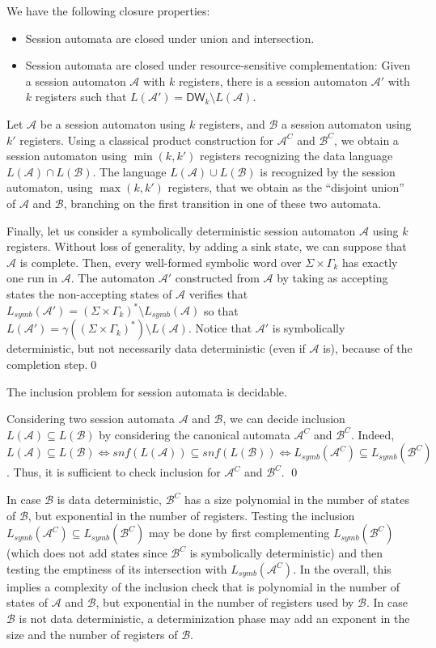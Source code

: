\documentclass{LMCS}
\def\A{\mathcal A}
\def\B{\mathcal B}
\def\cB{\mathcal B}
\def\concretization{\gamma}
\newcommand{\kNat}[1]{\Gamma_{#1}}
\newcommand{\symbL}{L_\mathit{symb}}
\newcommand{\can}[1]{#1^{C}}
\newcommand{\snf}{\mathit{snf}}
\newcommand{\Bounded}[1]{\mathsf{DW}_{#1}}
\begin{document}
\begin{thm}
We have the following closure properties:
\begin{itemize}\label{thm:closure}
\item Session automata are closed under union and intersection.
\item Session automata are closed under resource-sensitive complementation:
  Given a session automaton $\A$ with $k$ registers, there is a
  session automaton $\A'$ with $k$ registers such that $L(\A')
  = \Bounded{k} \setminus L(\A)$.
\end{itemize}
\end{thm}
\proof
  Let $\A$ be a session automaton using $k$ registers, and $\B$ a
  session automaton using $k'$ registers. Using a classical product
  construction for $\can \A$ and $\can \cB$, we obtain a session
  automaton using $\min(k,k')$ registers recognizing the data language
  $L(\A)\cap L(\B)$.  The language $L(\A)\cup L(\B)$
  is recognized by the session automaton, using $\max(k,k')$
  registers, that we obtain as the ``disjoint union'' of $\A$ and
  $\cB$, branching on the first transition in one of these two
  automata.

  Finally, let us consider a symbolically deterministic session
  automaton $\A$ using $k$ registers. Without loss of generality, by
  adding a sink state, we can suppose that $\A$ is complete. Then,
  every well-formed symbolic word over $\Sigma\times \kNat{k}$ has
  exactly one run in $\A$. The automaton $\A'$ constructed from $\A$
  by taking as accepting states the non-accepting states of $\A$
  verifies that $\symbL(\A') = (\Sigma\times
  \kNat{k})^{*}\setminus\symbL(\A)$ so that $L(\A')
  =\concretization((\Sigma\times \kNat{k})^{*})\setminus
  L(\A)$. Notice that $\A'$ is symbolically deterministic, but not
  necessarily data deterministic (even if $\A$ is), because of the
  completion step.\qed

\begin{thm}\label{thm:inclusion}
  The inclusion problem for session automata is decidable.
\end{thm}
\proof Considering two session automata $\A$ and $\B$, we can decide
inclusion $L(\A)\subseteq L(\B)$ by considering the canonical automata
$\can\A$ and $\can\B$. Indeed, $L(\A)\subseteq L(\B)
\Longleftrightarrow \snf(L(\A))\subseteq \snf(L(\B))
\Longleftrightarrow \symbL(\can\A)\subseteq \symbL(\can\B)$.
Thus, it is sufficient to check inclusion for $\can\A$ and
$\can\B$. \qed

In case $\B$ is data deterministic, $\can\B$ has a size polynomial in
the number of states of $\B$, but exponential in the number of
registers. Testing the inclusion $\symbL(\can\A)\subseteq
\symbL(\can\B)$ may be done by first complementing $\symbL(\can\B)$
(which does not add states since $\can\B$ is symbolically
deterministic) and then testing the emptiness of its intersection with
$\symbL(\can\A)$. In the overall, this implies a complexity of the
inclusion check that is polynomial in the number of states of $\A$ and
$\B$, but exponential in the number of registers used by $\B$. In case
$\B$ is not data deterministic, a determinization phase may add an
exponent in the size and the number of registers of $\B$.
\end{document}
